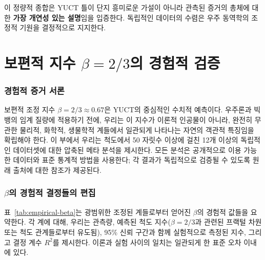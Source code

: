 \documentclass[11pt,a4paper]{article}
\begin{document}
이 정량적 종합은 YUCT 틀이 단지 흥미로운 가설이 아니라 관측된 증거의 총체에 대한 \textbf{가장 개연성 있는 설명}임을 입증한다. 독립적인 데이터의 수렴은 우주 동역학의 조정적 기원을 결정적으로 지지한다.


\part{보편적 지수 \(\beta = 2/3\)의 경험적 검증}
\label{part:V}

\section{경험적 증거 서론}

보편적 조정 지수 \(\beta = 2/3 \approx 0.67\)은 YUCT의 중심적인 수치적 예측이다. 우주론과 빅뱅의 임계 질량에 적용하기 전에, 우리는 이 지수가 이론적 인공물이 아니라, 완전히 무관한 물리적, 화학적, 생물학적 계들에서 일관되게 나타나는 자연의 객관적 특징임을 확립해야 한다. 이 부에서 우리는 척도에서 50 자릿수 이상에 걸친 12개 이상의 독립적인 데이터셋에 대한 압축된 메타 분석을 제시한다. 모든 분석은 공개적으로 이용 가능한 데이터와 표준 통계적 방법을 사용한다; 각 결과가 독립적으로 검증될 수 있도록 원래 출처에 대한 참조가 제공된다.

\section{\(\beta\)의 경험적 결정들의 편집}

표~\ref{tab:empirical-beta}는 광범위한 조정된 계들로부터 얻어진 \(\beta\)의 경험적 값들을 요약한다. 각 계에 대해, 우리는 관측량, 예측된 척도 지수(\(\beta = 2/3\)과 관련된 프랙털 차원 또는 척도 관계들로부터 유도됨), 95\% 신뢰 구간과 함께 실험적으로 측정된 지수, 그리고 결정 계수 \(R^2\)를 제시한다. 이론과 실험 사이의 일치는 일관되게 한 표준 오차 이내에 있다.
\end{document}
